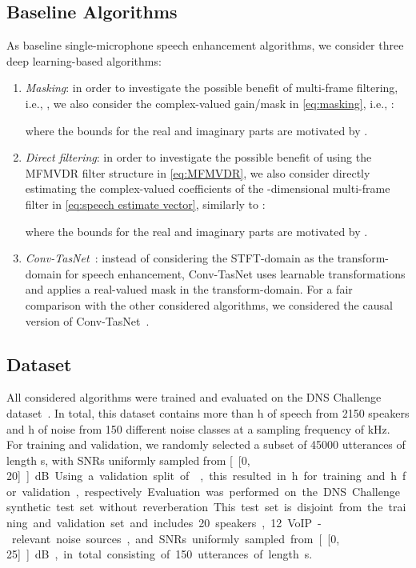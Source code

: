 \documentclass{article}
\begin{document}
\subsection{Baseline Algorithms}
\label{sec:baselines}
As baseline single-microphone speech enhancement algorithms, we consider three deep learning-based algorithms:
\begin{enumerate}
	\item \emph{Masking}: in order to investigate the possible benefit of multi-frame filtering, i.e., , we also consider the complex-valued gain/mask in \eqref{eq:masking}, i.e., :
	
	where the bounds for the real and imaginary parts are motivated by \cite{le_roux_phasebook_2019}.
	\item \emph{Direct filtering}: in order to investigate the possible benefit of using the MFMVDR filter structure in \eqref{eq:MFMVDR}, we also consider directly estimating the complex-valued coefficients of the -dimensional multi-frame filter  in \eqref{eq:speech estimate vector}, similarly to \cite{mack_deep_2019}:
	
	where the bounds for the real and imaginary parts are motivated by \cite{mack_deep_2019}.
	\item \emph{Conv-TasNet}~\cite{luo_conv-tasnet_2019}: instead of considering the STFT-domain as the transform-domain for speech enhancement, Conv-TasNet uses learnable transformations and applies a real-valued mask in the transform-domain.
	For a fair comparison with the other considered algorithms, we considered the causal version of Conv-TasNet~\cite{luo_conv-tasnet_2019}.
\end{enumerate}

\subsection{Dataset}
\label{sec:dataset}
All considered algorithms were trained and evaluated on the DNS Challenge dataset~\cite{reddy_interspeech_2020}.
In total, this dataset contains more than \unit[500]{h} of speech from 2150 speakers and \unit[180]{h} of noise from 150 different noise classes at a sampling frequency of \unit[16]{kHz}.
For training and validation, we randomly selected a subset of 45000 utterances of length \unit[4]{s}, with SNRs uniformly sampled from \unit[{[0, 20]}]{dB}.
Using a validation split of \unit[20]{}, this resulted in \unit[40]{h} for training and \unit[10]{h} for validation, respectively.
Evaluation was performed on the DNS Challenge synthetic test set without reverberation.
This test set is disjoint from the training and validation set and includes 20 speakers, 12 VoIP-relevant noise sources, and SNRs uniformly sampled from \unit[{[0, 25]}]{dB}, in total consisting of 150 utterances of length \unit[10]{s}.
\end{document}
